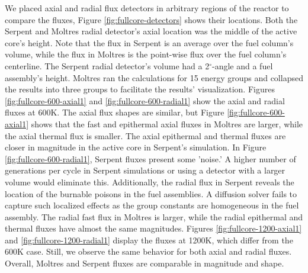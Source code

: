 We placed axial and radial flux detectors in arbitrary regions of the reactor to compare the fluxes, Figure \ref{fig:fullcore-detectors} shows their locations.
Both the Serpent and Moltres radial detector's axial location was the middle of the active core's height.
Note that the flux in Serpent is an average over the fuel column's volume, while the flux in Moltres is the point-wise flux over the fuel column's centerline.
The Serpent radial detector's volume had a 2$^{\circ}$-angle and a fuel assembly's height.
Moltres ran the calculations for 15 energy groups and collapsed the results into three groups to facilitate the results' visualization.
Figures \ref{fig:fullcore-600-axial1} and \ref{fig:fullcore-600-radial1} show the axial and radial fluxes at 600K.
The axial flux shapes are similar, but Figure \ref{fig:fullcore-600-axial1} shows that the fast and epithermal axial fluxes in Moltres are larger, while the axial thermal flux is smaller.
The axial epithermal and thermal fluxes are closer in magnitude in the active core in Serpent's simulation.
In Figure \ref{fig:fullcore-600-radial1}, Serpent fluxes present some 'noise.'
A higher number of generations per cycle in Serpent simulations or using a detector with a larger volume would eliminate this.
Additionally, the radial flux in Serpent reveals the location of the burnable poisons in the fuel assemblies.
A diffusion solver fails to capture such localized effects as the group constants are homogeneous in the fuel assembly.
The radial fast flux in Moltres is larger, while the radial epithermal and thermal fluxes have almost the same magnitudes.
Figures \ref{fig:fullcore-1200-axial1} and \ref{fig:fullcore-1200-radial1} display the fluxes at 1200K, which differ from the 600K case.
Still, we observe the same behavior for both axial and radial fluxes.
Overall, Moltres and Serpent fluxes are comparable in magnitude and shape.

